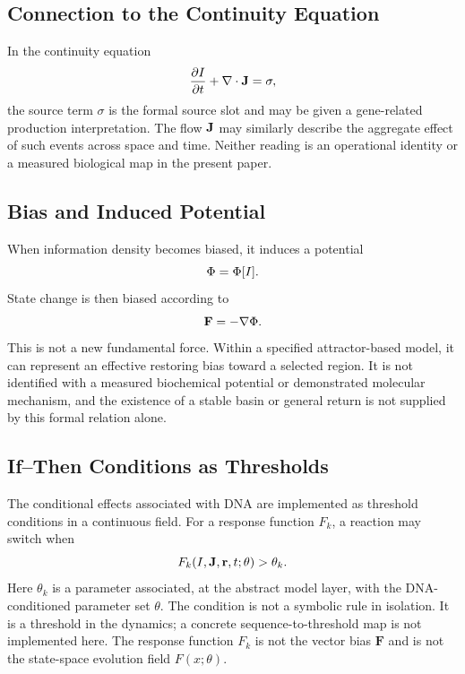 \subsection{Connection to the Continuity Equation}

In the continuity equation
\begin{equation}
  \frac{\partial I}{\partial t} + \nabla \cdot \mathbf{J} = \sigma,
\end{equation}
the source term \(\sigma\) is the formal source slot and may be given a gene-related production interpretation. The flow \(\mathbf{J}\) may similarly describe the aggregate effect of such events across space and time. Neither reading is an operational identity or a measured biological map in the present paper.

\subsection{Bias and Induced Potential}

When information density becomes biased, it induces a potential
\begin{equation}
  \Phi = \Phi[I].
\end{equation}
State change is then biased according to
\begin{equation}
  \mathbf{F} = -\nabla \Phi.
\end{equation}
This is not a new fundamental force. Within a specified attractor-based model, it can represent an effective restoring bias toward a selected region. It is not identified with a measured biochemical potential or demonstrated molecular mechanism, and the existence of a stable basin or general return is not supplied by this formal relation alone.

\subsection{If--Then Conditions as Thresholds}

The conditional effects associated with DNA are implemented as threshold conditions in a continuous field. For a response function \(F_k\), a reaction may switch when
\begin{equation}
  F_k(I,\mathbf{J},\mathbf{r},t;\theta) > \theta_k.
\end{equation}
Here \(\theta_k\) is a parameter associated, at the abstract model layer, with the DNA-conditioned parameter set \(\theta\). The condition is not a symbolic rule in isolation. It is a threshold in the dynamics; a concrete sequence-to-threshold map is not implemented here.
The response function \(F_k\) is not the vector bias \(\mathbf{F}\) and is not the state-space evolution field \(F(x;\theta)\).

